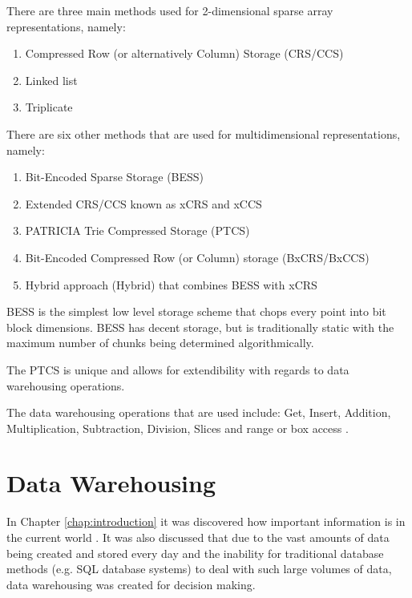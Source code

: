 There are three main methods used for 2-dimensional sparse array representations, namely: 
\begin{enumerate}
	\item Compressed Row (or alternatively Column) Storage (CRS/CCS)
	\item Linked list
	\item Triplicate 
\end{enumerate}	

There are six other methods that are used for multidimensional representations, namely: 
\begin{enumerate}
	\item Bit-Encoded Sparse Storage (BESS) 
	\item Extended CRS/CCS known as xCRS and xCCS
	\item PATRICIA Trie Compressed Storage (PTCS)
	\item Bit-Encoded Compressed Row (or Column) storage (BxCRS/BxCCS)
	\item Hybrid approach (Hybrid) that combines BESS with xCRS
\end{enumerate}

BESS is the simplest low level storage scheme that chops every point into bit block dimensions. BESS has decent storage, but is traditionally static with the maximum number of chunks being determined algorithmically.

The PTCS is unique and allows for extendibility with regards to data warehousing operations.

The data warehousing operations that are used include: Get, Insert, Addition, Multiplication, Subtraction, Division, Slices and range or box access .

\section{Data Warehousing}
In Chapter \ref{chap:introduction} it was discovered how important information is in the current world \cite{golfarelli:2009:dwd}. It was also discussed that due to the vast amounts of data being created and stored every day and the inability for traditional database methods (e.g. SQL database systems) to deal with such large volumes of data, data warehousing was created for decision making.


